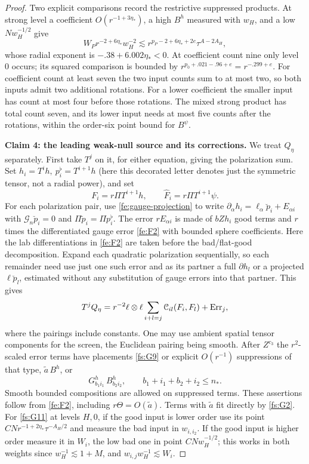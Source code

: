 \begin{proof}
Two explicit comparisons record the restrictive suppressed products.
At strong level a coefficient $O(r^{-1+3\eta_*})$,
a high $B^h$ measured with $w_H$, and a low $Nw_H^{-1/2}$ give
\[
 W_Pr^{-2+6\eta_*}w_H^{-2}
 \lesssim r^{p_P-2+6\eta_*+2e}\tau^{A-2A_H},
\]
whose radial exponent is $-.38+6.002\eta_*<0$.
At coefficient count nine only level $0$ occurs; its squared
comparison is bounded by
$r^{p_0+.021-.96+e}=r^{-.299+e}$.
For coefficient count at least seven the two input counts sum to
at most two, so both inputs admit two additional rotations.
For a lower coefficient the smaller input has count at most four
before those rotations.  The mixed strong product has total count
seven, and its lower input needs at most five counts after the
rotations, within the order-six point bound for $B^\psi$.

\par\medskip\noindent\textbf{Claim 4: the leading weak-null source and its corrections.}\label{fs:claim-quadratic}\quad
We treat \(Q_\eta\) separately. First take \(T^j\) on it, for either equation, giving the polarization sum. Set \(h_i=T^i h,\ p_i^\flat=T^{i+1}h\) (here this decorated letter denotes just the symmetric tensor, not a radial power), and set
\[
       F_i=r\Pi T^{i+1} h,\qquad \widehat F_i=r\Pi T^{i+1}\psi .
\]
For each polarization pair, use \eqref{fe:gauge-projection} to write
$\partial_\alpha h_i=\ell_\alpha\breve p_i+E_{\alpha i}$ with
$\mathcal G_n\breve p_i=0$ and $\Pi\breve p_i=\Pi p_i^\flat$.
The error \(r E_{\alpha i}\) is made of \(b Z h_i\) good terms and \(r\) times the differentiated gauge error \eqref{fe:F2} with bounded sphere coefficients. Here the lab differentiations in \eqref{fe:F2} are taken before the bad/flat-good decomposition. Expand each quadratic polarization sequentially, so each remainder need use just one such error and as its partner a full \(\partial h_l\) or a projected \(\ell\breve p_l\), estimated without any substitution of gauge errors into that partner. This gives
\begin{equation}
\label{fs:G10}
T^j Q_\eta
      =r^{-2}\ell\otimes\ell\sum_{i+l=j}\mathcal C_{il}(F_i,F_l)
                     +{\rm Err}_j,
\end{equation}
where the pairings include constants. One may use ambient spatial tensor components for the screen, the Euclidean pairing being smooth. After \(Z^{c_3}\) the \(r^2\)-scaled error terms have placements \eqref{fs:G9} or explicit \(O(r^{-1})\) suppressions of that type, \(\widetilde a\,B^h\), or
\begin{equation}
\label{fs:G11}
G^h_{b_1 i_1}\,B^h_{b_2 i_2},\qquad
                    b_1+i_1+b_2+i_2\le n_* .
\end{equation}
Smooth bounded compositions are allowed on suppressed terms. These assertions follow from \eqref{fe:F2}, including \(r\Theta=O(\widetilde a)\). Terms with \(\widetilde a\) fit directly by \eqref{fs:G2}. For \eqref{fs:G11} at levels \(H,0\), if the good input is lower order use its point \(C N r^{-1+2\eta_*}\tau^{-A_H/2}\) and measure the bad input in \(w_{i,i_2}\). If the good input is higher order measure it in \(W_i\), the low bad one in point \(C N w_H^{-1/2}\); this works in both weights since \(w_H^{-1}\lesssim1+M\), and \(w_{i,j}w_H^{-1}\lesssim W_i\).


\end{proof}

